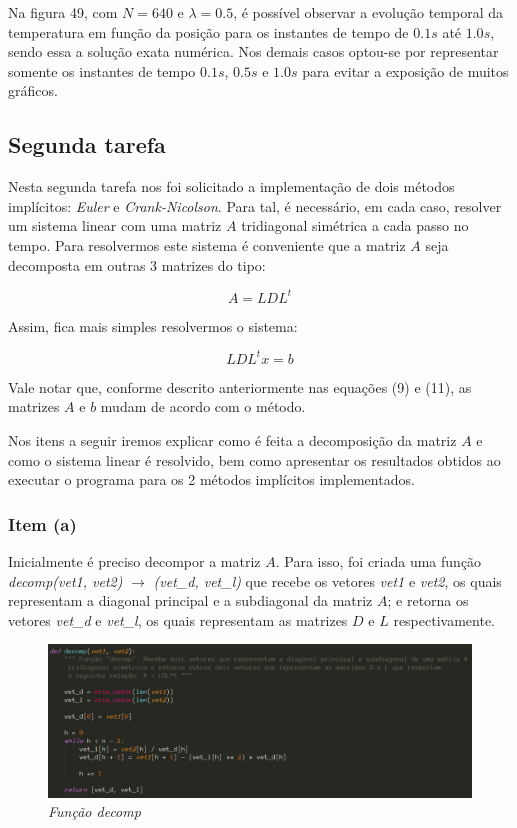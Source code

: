 \documentclass[a4paper, 12pt]{article}
\begin{document}
Na figura 49, com $N=640$ e $\lambda = 0.5$, é possível observar a evolução temporal da temperatura em função da posição para os instantes de tempo de $0.1s$ até $1.0s$, sendo essa a solução exata numérica. Nos demais casos optou-se por representar somente os instantes de tempo $0.1s$, $0.5s$ e $1.0s$ para evitar a exposição de muitos gráficos. 


\subsection{Segunda tarefa}

Nesta segunda tarefa nos foi solicitado a implementação de dois métodos implícitos: \textit{Euler} e \textit{Crank-Nicolson}. Para tal, é necessário, em cada caso, resolver um sistema linear com uma matriz $A$ tridiagonal simétrica a cada passo no tempo. Para resolvermos este sistema é conveniente que a matriz $A$ seja decomposta em outras 3 matrizes do tipo:

$$
A=LDL^t
$$

Assim, fica mais simples resolvermos o sistema:

$$
LDL^{t} x = b
$$

Vale notar que, conforme descrito anteriormente nas equações (9) e (11), as matrizes $A$ e $b$ mudam de acordo com o método. 

Nos itens a seguir iremos explicar como é feita a decomposição da matriz $A$ e como o sistema linear é resolvido, bem como apresentar os resultados obtidos ao executar o programa para os 2 métodos implícitos implementados.

\subsubsection{Item (a)}

Inicialmente é preciso decompor a matriz $A$. Para isso, foi criada uma função \\ \textit{decomp(vet1, vet2)} $\rightarrow$ \textit{(vet\_d, vet\_l)} que recebe os vetores \textit{vet1} e \textit{vet2}, os quais representam a diagonal principal e a subdiagonal da matriz $A$; e retorna os vetores \textit{vet\_d} e \textit{vet\_l}, os quais representam as matrizes $D$ e $L$ respectivamente.

\begin{figure}[H]
	\centering
	\includegraphics[scale=0.5]{img/decomp.png}
	\caption{\textit{Função decomp}}
\end{figure}
\end{document}
